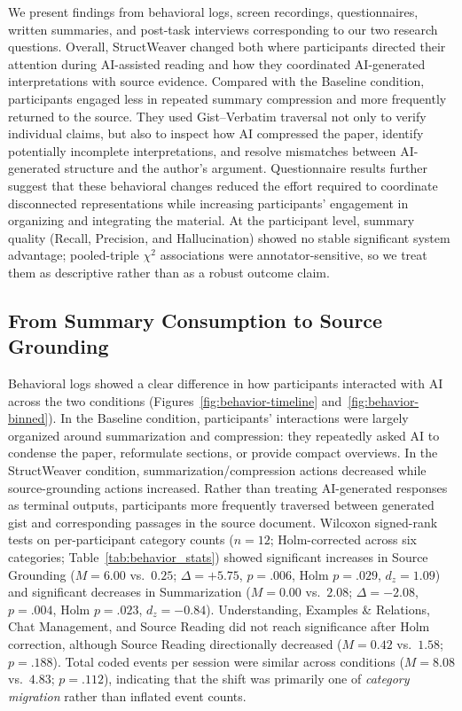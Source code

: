 \documentclass[manuscript,review,anonymous]{acmart}
\begin{document}
We present findings from behavioral logs, screen recordings, questionnaires, written summaries, and post-task interviews corresponding to our two research questions. Overall, StructWeaver changed both where participants directed their attention during AI-assisted reading and how they coordinated AI-generated interpretations with source evidence. Compared with the Baseline condition, participants engaged less in repeated summary compression and more frequently returned to the source. They used Gist--Verbatim traversal not only to verify individual claims, but also to inspect how AI compressed the paper, identify potentially incomplete interpretations, and resolve mismatches between AI-generated structure and the author's argument. Questionnaire results further suggest that these behavioral changes reduced the effort required to coordinate disconnected representations while increasing participants' engagement in organizing and integrating the material. At the participant level, summary quality (Recall, Precision, and Hallucination) showed no stable significant system advantage; pooled-triple $\chi^2$ associations were annotator-sensitive, so we treat them as descriptive rather than as a robust outcome claim.

\subsection{From Summary Consumption to Source Grounding}
\label{sec:behavior-logs}

Behavioral logs showed a clear difference in how participants interacted with AI across the two conditions (Figures~\ref{fig:behavior-timeline} and~\ref{fig:behavior-binned}). In the Baseline condition, participants' interactions were largely organized around summarization and compression: they repeatedly asked AI to condense the paper, reformulate sections, or provide compact overviews. In the StructWeaver condition, summarization/compression actions decreased while source-grounding actions increased. Rather than treating AI-generated responses as terminal outputs, participants more frequently traversed between generated gist and corresponding passages in the source document. Wilcoxon signed-rank tests on per-participant category counts ($n=12$; Holm-corrected across six categories; Table~\ref{tab:behavior_stats}) showed significant increases in Source Grounding ($M=6.00$ vs.\ $0.25$; $\Delta=+5.75$, $p=.006$, Holm $p=.029$, $d_z=1.09$) and significant decreases in Summarization ($M=0.00$ vs.\ $2.08$; $\Delta=-2.08$, $p=.004$, Holm $p=.023$, $d_z=-0.84$). Understanding, Examples \& Relations, Chat Management, and Source Reading did not reach significance after Holm correction, although Source Reading directionally decreased ($M=0.42$ vs.\ $1.58$; $p=.188$). Total coded events per session were similar across conditions ($M=8.08$ vs.\ $4.83$; $p=.112$), indicating that the shift was primarily one of \emph{category migration} rather than inflated event counts.
\end{document}
